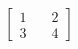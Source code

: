 \documentclass[preview]{standalone}
\begin{document}
\begin{align*}
\begin{bmatrix} 1 & \quad 2 \\ 3 & \quad 4 \end{bmatrix}
\end{align*}
\end{document}
